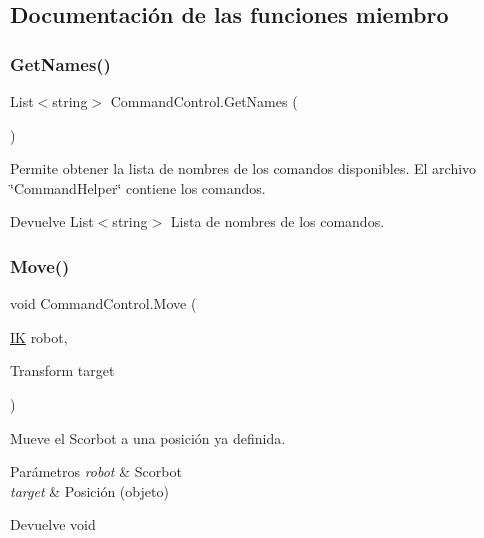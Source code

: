 \subsection{Documentación de las funciones miembro}
\mbox{\label{class_command_control_abb616afbdc86f4877b19b951982b6544}} 
\subsubsection{\texorpdfstring{GetNames()}{GetNames()}}
{\footnotesize\ttfamily List$<$string$>$ Command\+Control.\+Get\+Names (\begin{DoxyParamCaption}{ }\end{DoxyParamCaption})\hspace{0.3cm}{\ttfamily [inline]}}

Permite obtener la lista de nombres de los comandos disponibles. El archivo \char`\"{}\+Command\+Helper\char`\"{} contiene los comandos. \begin{DoxyReturn}{Devuelve}
List$<$string$>$ Lista de nombres de los comandos. 
\end{DoxyReturn}
\mbox{\label{class_command_control_a57aac28ce1f8ad74a4c2b69a24db8d79}} 
\subsubsection{\texorpdfstring{Move()}{Move()}}
{\footnotesize\ttfamily void Command\+Control.\+Move (\begin{DoxyParamCaption}\item[{\mbox{\hyperlink{class_i_k}{IK}}}]{robot,  }\item[{Transform}]{target }\end{DoxyParamCaption})\hspace{0.3cm}{\ttfamily [inline]}}

Mueve el Scorbot a una posición ya definida. 
\begin{DoxyParams}{Parámetros}
{\em robot} & Scorbot \\
\hline
{\em target} & Posición (objeto) \\
\hline
\end{DoxyParams}
\begin{DoxyReturn}{Devuelve}
void 
\end{DoxyReturn}
\mbox{\label{class_command_control_ab0c2d7d4d5b0ec2329f3bf945af1cbc0}} 

